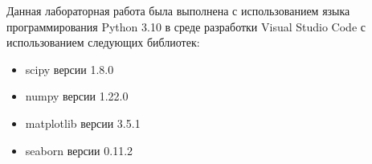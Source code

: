 Данная лабораторная работа была выполнена с использованием языка
программирования Python 3.10 в среде разработки Visual Studio Code с
использованием следующих библиотек:
\begin{itemize}
\item scipy версии 1.8.0
\item numpy версии 1.22.0
\item matplotlib версии 3.5.1
\item seaborn версии 0.11.2
\end{itemize}
